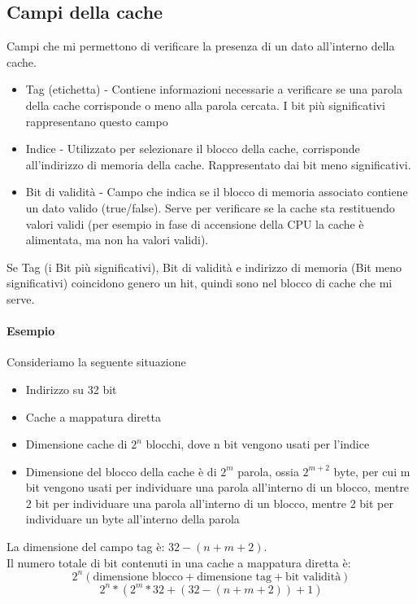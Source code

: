 \documentclass[12pt, a4paper, openany]{book}
\begin{document}
\subsection{Campi della cache}
Campi che mi permettono di verificare la presenza di un dato all'interno della cache.
\begin{itemize}
    \item Tag (etichetta) - Contiene informazioni necessarie a verificare se una parola
    della cache corrisponde o meno alla parola cercata. I bit più significativi rappresentano questo campo
    \item Indice - Utilizzato per selezionare il blocco della cache, corrisponde all'indirizzo
    di memoria della cache. Rappresentato dai bit meno significativi.
    \item Bit di validità - Campo che indica se il blocco di memoria associato contiene un dato valido
    (true/false). Serve per verificare se la cache sta restituendo valori validi (per esempio in fase di
    accensione della CPU la cache è alimentata, ma non ha valori validi).
\end{itemize}

Se Tag (i Bit più significativi), Bit di validità e indirizzo di memoria (Bit meno significativi)
coincidono genero un hit, quindi sono nel blocco di cache che mi serve.

\paragraph{Esempio} Consideriamo la seguente situazione
\begin{itemize}
    \item Indirizzo su 32 bit
    \item Cache a mappatura diretta
    \item Dimensione cache di $2^n$ blocchi, dove n bit vengono usati per l'indice
    \item Dimensione del blocco della cache è di $2^m$ parola, ossia $2^{m+2}$ byte,
    per cui m bit vengono usati per individuare una parola all'interno di un blocco, mentre
    2 bit per individuare una parola all'interno di un blocco, mentre 2 bit per individuare un
    byte all'interno della parola
\end{itemize}
La dimensione del campo tag è: $32 - (n+m+2)$.
\\ Il numero totale di bit contenuti in una cache a mappatura diretta è:
\begin{equation*}
    2^n (\mbox{dimensione blocco} + \mbox{dimensione tag} + \mbox{bit validità})
\end{equation*}
\begin{equation*}
    2^n * (2^m * 32 + (32 - (n + m + 2)) + 1)
\end{equation*}
\end{document}
